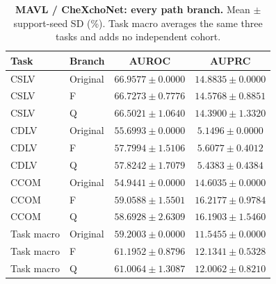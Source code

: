 \begin{table}[tp]
\centering
\caption{\textbf{MAVL / CheXchoNet: every path branch.} Mean $\pm$ support-seed SD (\%). Task macro averages the same three tasks and adds no independent cohort.}
\label{tab:supp-cardiac-path-mavl}
\small
\setlength{\tabcolsep}{4pt}
\begin{tabular*}{\textwidth}{@{\extracolsep{\fill}}llcc@{}}
\toprule
Task & Branch & AUROC & AUPRC \\
\midrule
CSLV & Original & $66.9577\pm0.0000$ & $14.8835\pm0.0000$ \\
CSLV & F & $66.7273\pm0.7776$ & $14.5768\pm0.8851$ \\
CSLV & Q & $66.5021\pm1.0640$ & $14.3900\pm1.3320$ \\
CDLV & Original & $55.6993\pm0.0000$ & $5.1496\pm0.0000$ \\
CDLV & F & $57.7994\pm1.5106$ & $5.6077\pm0.4012$ \\
CDLV & Q & $57.8242\pm1.7079$ & $5.4383\pm0.4384$ \\
CCOM & Original & $54.9441\pm0.0000$ & $14.6035\pm0.0000$ \\
CCOM & F & $59.0588\pm1.5501$ & $16.2177\pm0.9784$ \\
CCOM & Q & $58.6928\pm2.6309$ & $16.1903\pm1.5460$ \\
Task macro & Original & $59.2003\pm0.0000$ & $11.5455\pm0.0000$ \\
Task macro & F & $61.1952\pm0.8796$ & $12.1341\pm0.5328$ \\
Task macro & Q & $61.0064\pm1.3087$ & $12.0062\pm0.8210$ \\
\bottomrule
\end{tabular*}
\end{table}

